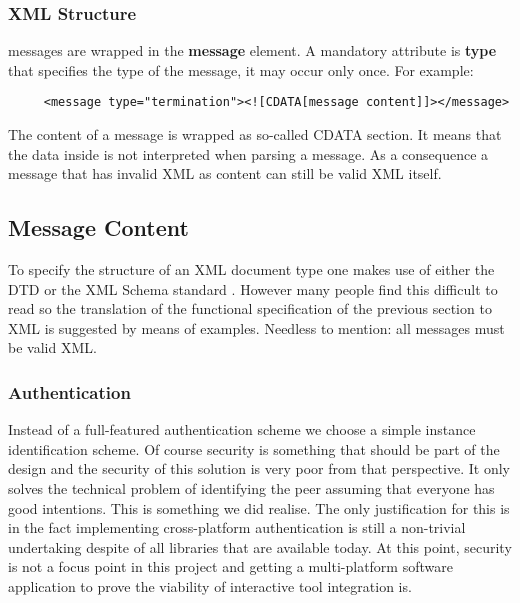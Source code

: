 \documentclass{article}
\begin{document}
   \subsubsection{XML Structure}

    \noindent messages are wrapped in the \textbf{message} element. A mandatory attribute
    is \textbf{type} that specifies the type of the message, it may occur only
    once. For example:
 
    \begin{verbatim}
     <message type="termination"><![CDATA[message content]]></message>\end{verbatim}

    The content of a message is wrapped as so-called CDATA section. It means
    that the data inside is not interpreted when parsing a message. As a
    consequence a message that has invalid XML as content can still be valid
    XML itself.

  \subsection{Message Content}

   To specify the structure of an XML document type one makes use of either the
   DTD or the XML Schema standard \cite{Malhotra:06:XSP}. However many people
   find this difficult to read so the translation of the functional
   specification of the previous section to XML is suggested by means of
   examples. Needless to mention: all messages must be valid XML.

  \subsubsection{Authentication}

   Instead of a full-featured authentication scheme we choose a simple instance
   identification scheme. Of course security is something that should be part
   of the design and the security of this solution is very poor from that
   perspective. It only solves the technical problem of identifying the peer
   assuming that everyone has good intentions. This is something we did
   realise. The only justification for this is in the fact implementing
   cross-platform authentication is still a non-trivial undertaking despite of
   all libraries that are available today.  At this point, security is not a
   focus point in this project and getting a multi-platform software
   application to prove the viability of interactive tool integration is.
\end{document}
